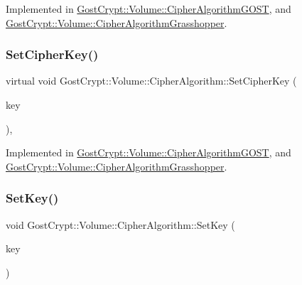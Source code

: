 Implemented in \hyperlink{class_gost_crypt_1_1_volume_1_1_cipher_algorithm_g_o_s_t_aecf6aeaabec9d6bb23babf7fbfc43a93}{Gost\+Crypt\+::\+Volume\+::\+Cipher\+Algorithm\+G\+O\+ST}, and \hyperlink{class_gost_crypt_1_1_volume_1_1_cipher_algorithm_grasshopper_adcc6948022fd1274d9e16d99e5ee442d}{Gost\+Crypt\+::\+Volume\+::\+Cipher\+Algorithm\+Grasshopper}.

\mbox{\label{class_gost_crypt_1_1_volume_1_1_cipher_algorithm_a98760f7a389f6fb5fd1d2078d0c1580f}} 
\subsubsection{\texorpdfstring{Set\+Cipher\+Key()}{SetCipherKey()}}
{\footnotesize\ttfamily virtual void Gost\+Crypt\+::\+Volume\+::\+Cipher\+Algorithm\+::\+Set\+Cipher\+Key (\begin{DoxyParamCaption}\item[{const quint8 $\ast$}]{key }\end{DoxyParamCaption})\hspace{0.3cm}{\ttfamily [protected]}, {}}



Implemented in \hyperlink{class_gost_crypt_1_1_volume_1_1_cipher_algorithm_g_o_s_t_ac2ccc5e5b4afa45c64775d5e296b8a91}{Gost\+Crypt\+::\+Volume\+::\+Cipher\+Algorithm\+G\+O\+ST}, and \hyperlink{class_gost_crypt_1_1_volume_1_1_cipher_algorithm_grasshopper_a32304b5f41ae22a3c461cd03a5b42041}{Gost\+Crypt\+::\+Volume\+::\+Cipher\+Algorithm\+Grasshopper}.

\mbox{\label{class_gost_crypt_1_1_volume_1_1_cipher_algorithm_a7275373584e3304f6a44cdba08da2139}} 
\subsubsection{\texorpdfstring{Set\+Key()}{SetKey()}}
{\footnotesize\ttfamily void Gost\+Crypt\+::\+Volume\+::\+Cipher\+Algorithm\+::\+Set\+Key (\begin{DoxyParamCaption}\item[{const \hyperlink{class_gost_crypt_1_1_buffer_ptr}{Buffer\+Ptr} \&}]{key }\end{DoxyParamCaption})\hspace{0.3cm}{\ttfamily [virtual]}}



